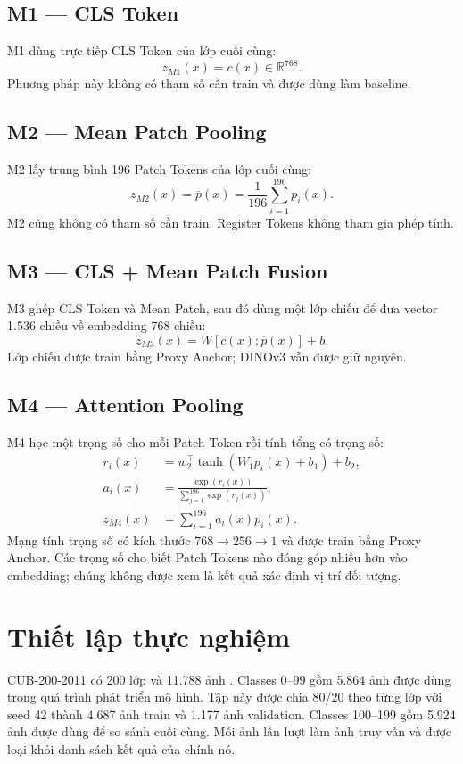 \documentclass[11pt,a4paper]{article}
\begin{document}
\subsection{M1 --- CLS Token}
M1 dùng trực tiếp CLS Token của lớp cuối cùng:
\begin{equation}
 z_{M1}(x)=c(x)\in\mathbb{R}^{768}.
\end{equation}
Phương pháp này không có tham số cần train và được dùng làm baseline.

\subsection{M2 --- Mean Patch Pooling}
M2 lấy trung bình 196 Patch Tokens của lớp cuối cùng:
\begin{equation}
 z_{M2}(x)=\overline p(x)=\frac{1}{196}\sum_{i=1}^{196}p_i(x).
\end{equation}
M2 cũng không có tham số cần train. Register Tokens không tham gia phép tính.

\subsection{M3 --- CLS + Mean Patch Fusion}
M3 ghép CLS Token và Mean Patch, sau đó dùng một lớp chiếu để đưa vector
1.536 chiều về embedding 768 chiều:
\begin{equation}
 z_{M3}(x)=W[c(x);\overline p(x)]+b.
\end{equation}
Lớp chiếu được train bằng Proxy Anchor; DINOv3 vẫn được giữ nguyên.

\subsection{M4 --- Attention Pooling}
M4 học một trọng số cho mỗi Patch Token rồi tính tổng có trọng số:
\begin{align}
 r_i(x)&=w_2^\top\tanh(W_1p_i(x)+b_1)+b_2,\\
 a_i(x)&=\frac{\exp(r_i(x))}{\sum_{j=1}^{196}\exp(r_j(x))},\\
 z_{M4}(x)&=\sum_{i=1}^{196}a_i(x)p_i(x).
\end{align}
Mạng tính trọng số có kích thước $768\rightarrow256\rightarrow1$ và được
train bằng Proxy Anchor. Các trọng số cho biết Patch Tokens nào đóng góp nhiều
hơn vào embedding; chúng không được xem là kết quả xác định vị trí đối tượng.

\section{Thiết lập thực nghiệm}
CUB-200-2011 có 200 lớp và 11.788 ảnh \cite{wah2011cub}. Classes 0--99 gồm
5.864 ảnh được dùng trong quá trình phát triển mô hình. Tập này được chia
80/20 theo từng lớp với seed 42 thành 4.687 ảnh train và 1.177 ảnh validation.
Classes 100--199 gồm 5.924 ảnh được dùng để so sánh cuối cùng. Mỗi ảnh lần
lượt làm ảnh truy vấn và được loại khỏi danh sách kết quả của chính nó.
\end{document}
